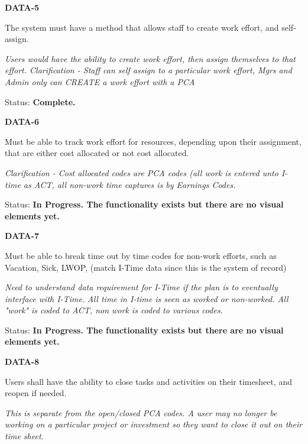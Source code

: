 \noindent 

\noindent \textbf{DATA-5}

\noindent The system must have a method that allows staff to create work effort, and self-assign.

\noindent \textit{Users would have the ability to create work effort, then assign themselves to that effort. Clarification - Staff can self assign to a particular work effort, Mgrs and Admin only can CREATE a work effort with a PCA}

Status: \textbf{Complete.}\textit{}\\

\noindent 

\noindent \textbf{DATA-6}

\noindent Must be able to track work effort for resources, depending upon their assignment, that are either cost allocated or not cost allocated. 

\noindent \textit{Clarification - Cost allocated codes are PCA codes (all work is entered unto I-time as ACT, all non-work time captures is by Earnings Codes.}

Status: \textbf{In Progress.  The functionality exists but there are no visual elements yet.}\textit{}\\

\noindent 

\noindent \textbf{DATA-7}

\noindent Must be able to break time out by time codes for non-work efforts, such as Vacation, Sick, LWOP, (match I-Time data since this is the system of record)

\noindent \textit{Need to understand data requirement for I-Time if the plan is to eventually interface with I-Time.} \textit{All time in I-time is seen as worked or non-worked.  All "work" is coded to ACT, non work is coded to various codes.}

\textit{ }Status: \textbf{In Progress.  The functionality exists but there are no visual elements yet.}\\

\noindent 

\noindent \textbf{DATA-8}

\noindent Users shall have the ability to close tasks and activities on their timesheet, and reopen if needed.

\noindent \textit{This is separate from the open/closed PCA codes.  A user may no longer be working on a particular project or investment so they want to close it out on their time sheet.}

